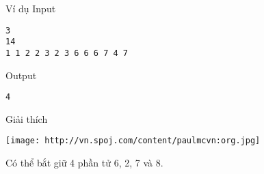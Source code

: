 Ví dụ
Input
\begin{verbatim}
3
14
1 1 2 2 3 2 3 6 6 6 7 4 7\end{verbatim}

Output
\begin{verbatim}
4\end{verbatim}

Giải thích


\texttt{[image: http://vn.spoj.com/content/paulmcvn:org.jpg]}

Có thể bắt giữ 4 phần tử 6, 2, 7 và 8.